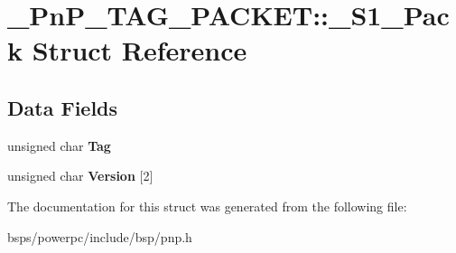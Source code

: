 \hypertarget{struct__PnP__TAG__PACKET_1_1__S1__Pack}{}\section{\+\_\+\+Pn\+P\+\_\+\+T\+A\+G\+\_\+\+P\+A\+C\+K\+ET\+::\+\_\+\+S1\+\_\+\+Pack Struct Reference}
\label{struct__PnP__TAG__PACKET_1_1__S1__Pack}
\subsection*{Data Fields}
\begin{DoxyCompactItemize}
\item 
\mbox{\label{struct__PnP__TAG__PACKET_1_1__S1__Pack_abea89572ecd8a830ac8c76bc0e90a243}} 
unsigned char {\bfseries Tag}
\item 
\mbox{\label{struct__PnP__TAG__PACKET_1_1__S1__Pack_ad53c41fefe7243a8423d088e6a1cb215}} 
unsigned char {\bfseries Version} \mbox{[}2\mbox{]}
\end{DoxyCompactItemize}


The documentation for this struct was generated from the following file\+:\begin{DoxyCompactItemize}
\item 
bsps/powerpc/include/bsp/pnp.\+h\end{DoxyCompactItemize}
